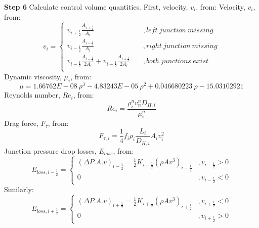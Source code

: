 \documentclass[11pt,letterpaper,titlepage]{article}
\newcommand{\half}{\frac{1}{2}}
\begin{document}
\vspace{0.5cm}\noindent
\textbf{Step 6}\newline
Calculate control volume quantities. First, velocity, $v_i$, from:
Velocity, $v_i$, from:
\begin{equation*}
v_i=
\begin{cases}
v_{i+\half} \frac{A_{i+\half}}{A_i} \quad &, left \ junction  \ missing \\
v_{i-\half} \frac{A_{i-\half}}{A_i} \quad &, right \ junction  \ missing \\
v_{i-\half} \frac{A_{i-\half}}{2A_i} + v_{i+\half} \frac{A_{i+\half}}{2A_i} \quad &, both \ junctions  \ exist \\
\end{cases}
\end{equation*}
\newline
Dynamic viscosity, $\mu_i$, from:
\begin{equation*}
\mu=1.66762E-08 \ \rho^3-4.83243E-05 \ \rho^2+0.046680223 \ \rho-15.03102921
\end{equation*}
\newline
Reynolds number, $Re_i$, from:
\begin{equation*}
Re_i=\frac{\rho_i^n v_n^n D_{H,i}}{\mu_i^n}
\end{equation*}
\newline
Drag force, $F_{\tau}$, from:
\begin{equation*}
F_{\tau,i}=\frac{1}{4} f_i \rho_i \frac{L_i}{D_{H,i}}A_i v_i^2 
\end{equation*}
\newline
Junction pressure drop losses, $E_{loss}$, from:
\begin{equation*}
E_{loss,i-\half}=
\begin{cases}
(\Delta P.A.v)_{i-\half} = \half  K_{i-\half} (\rho A v^3)_{i-\half}     &,v_{i-\half}>0 \\
0    &,v_{i-\half}<0
\end{cases}
\end{equation*}
\newline
\noindent Similarly:
\begin{equation*}
E_{loss,i+\half}=
\begin{cases}
(\Delta P.A.v)_{i+\half} = \half  K_{i+\half} (\rho A v^3)_{i+\half}     &,v_{i+\half}<0 \\
0    &,v_{i+\half}>0
\end{cases}
\end{equation*}
\end{document}
